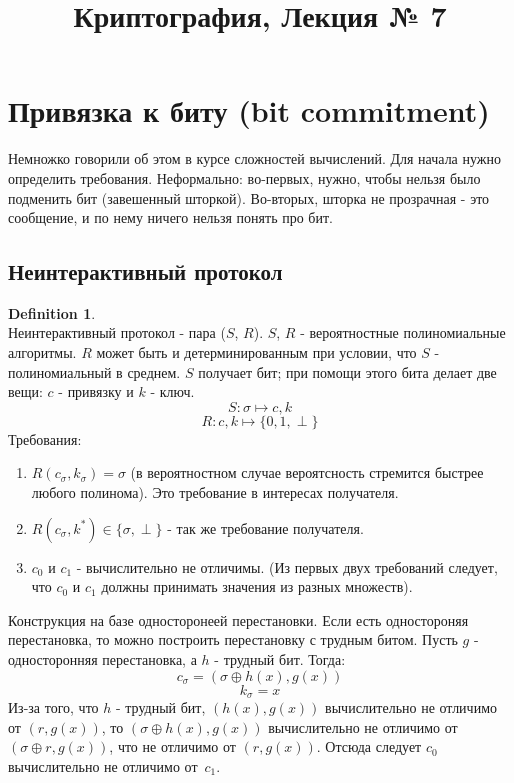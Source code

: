 \documentclass[a4paper]{article}
\title{Криптография, Лекция № 7}
\theoremstyle{definition}
\newtheorem{definition}{Definition}
\theoremstyle{plain}
\begin{document}
\maketitle

\section{Привязка к биту (bit commitment)}

\noindent Немножко говорили об этом в курсе сложностей вычислений.
Для начала нужно определить требования. Неформально: во-первых, нужно,
чтобы нельзя было подменить бит (завешенный шторкой).
Во-вторых, шторка не прозрачная - это сообщение, и по нему ничего нельзя понять про бит.

\subsection{Неинтерактивный протокол}

\begin{definition}~\\
	Неинтерактивный протокол - пара ($S$, $R$). $S$, $R$ - вероятностные
	полиномиальные алгоритмы. $R$ может быть и детерминированным при условии,
	что $S$ - полиномиальный в среднем. $S$ получает бит; при помощи этого бита делает две вещи:
	$c$ - привязку и $k$ - ключ.
	$$
		S\colon \sigma \mapsto c, k	
	$$
	$$
		R\colon c, k \mapsto \{0, 1, \perp\}	
	$$
	Требования:
	\begin{enumerate}
		\item $R(c_{\sigma}, k_{\sigma}) = \sigma$ (в вероятностном случае вероятсность стремится
			быстрее любого полинома). Это требование в интересах получателя.
		\item $R(c_{\sigma}, k^*) \in \{\sigma, \perp\}$ - так же требование получателя.
		\item $c_0$ и $c_1$ - вычислительно не отличимы. (Из первых двух требований следует,
			что $c_0$ и $c_1$ должны принимать значения из разных множеств).
	\end{enumerate}
\end{definition}

\noindent Конструкция на базе односторонеей перестановки. Если есть одностороняя перестановка,
то можно построить перестановку с трудным битом. Пусть $g$ - односторонняя перестановка, а $h$ -
трудный бит. Тогда:
$$
	c_{\sigma} = (\sigma \oplus h(x), g(x))
$$
$$
	k_{\sigma} = x
$$
Из-за того, что $h$ - трудный бит, $(h(x), g(x))$ вычислительно не отличимо от $(r, g(x))$,
то $(\sigma\oplus h(x), g(x))$ вычислительно не отличимо от $(\sigma \oplus r, g(x))$, что
не отличимо от $(r, g(x))$. Отсюда следует $c_0$ вычислительно не отличимо от~$c_1$.~\\
\end{document}
